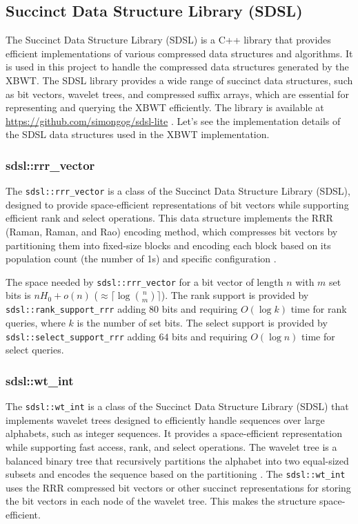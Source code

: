 \subsection{Succinct Data Structure Library (SDSL)}
The Succinct Data Structure Library (SDSL) is a C++ library that provides efficient implementations of various compressed data structures and algorithms. It is used in this project to handle the compressed data structures generated by the XBWT. The SDSL library provides a wide range of succinct data structures, such as bit vectors, wavelet trees, and compressed suffix arrays, which are essential for representing and querying the XBWT efficiently. The library is available at \url{https://github.com/simongog/sdsl-lite} \cite{gbmp2014sea}. Let's see the implementation details of the SDSL data structures used in the XBWT implementation.

\subsubsection{sdsl::rrr\_vector}
The \texttt{sdsl::rrr\_vector} is a class of the Succinct Data Structure Library (SDSL), designed to provide space-efficient representations of bit vectors while supporting efficient rank and select operations. This data structure implements the RRR (Raman, Raman, and Rao) encoding method, which compresses bit vectors by partitioning them into fixed-size blocks and encoding each block based on its population count (the number of 1s) and specific configuration \cite{raman2002succinct}.

The space needed by \texttt{sdsl::rrr\_vector} for a bit vector of length $n$ with $m$ set bits is $nH_0 + o(n)$ ($\approx \lceil \log \binom{n}{m} \rceil$). The rank support is provided by \texttt{sdsl::rank\_support\_rrr} adding $80$ bits and requiring $O(\log k)$ time for rank queries, where $k$ is the number of set bits. The select support is provided by \texttt{sdsl::select\_support\_rrr} adding $64$ bits and requiring $O(\log n)$ time for select queries.

\subsubsection{sdsl::wt\_int}
The \texttt{sdsl::wt\_int} is a class of the Succinct Data Structure Library (SDSL) that implements wavelet trees designed to efficiently handle sequences over large alphabets, such as integer sequences. It provides a space-efficient representation while supporting fast access, rank, and select operations. The wavelet tree is a balanced binary tree that recursively partitions the alphabet into two equal-sized subsets and encodes the sequence based on the partitioning \cite{grossi2003high}. The \texttt{sdsl::wt\_int} uses the RRR compressed bit vectors or other succinct representations for storing the bit vectors in each node of the wavelet tree.
This makes the structure space-efficient.

